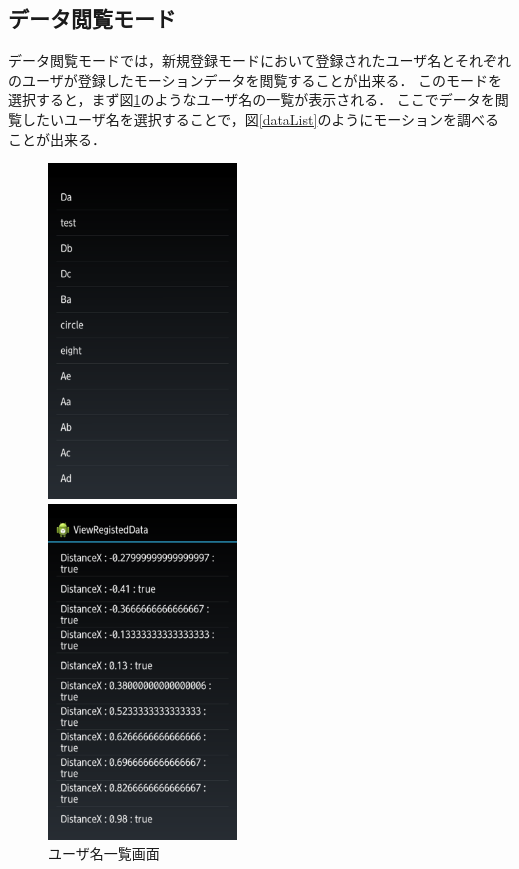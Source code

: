\documentclass[12pt]{jreport}
\begin{document}
        \subsection{データ閲覧モード}
        データ閲覧モードでは，新規登録モードにおいて登録されたユーザ名とそれぞれのユーザが登録したモーションデータを閲覧することが出来る．
        このモードを選択すると，まず図\ref{userList}のようなユーザ名の一覧が表示される．
        ここでデータを閲覧したいユーザ名を選択することで，図\ref{dataList}のようにモーションを調べることが出来る．

        \begin{figure}[tbp]
            \begin{minipage}{0.5\hsize}
                \begin{center}
                    \includegraphics[width=5cm, bb=0 0 540 960]{UserList.pdf}
                \end{center}
                \caption{ユーザ名一覧画面}
                \label{userList}
            \end{minipage}
            \begin{minipage}{0.5\hsize}
                \begin{center}
                    \includegraphics[width=5cm, bb=0 0 540 960]{DataList.pdf}

\end{center}
\end{minipage}
\end{figure}
\end{document}

